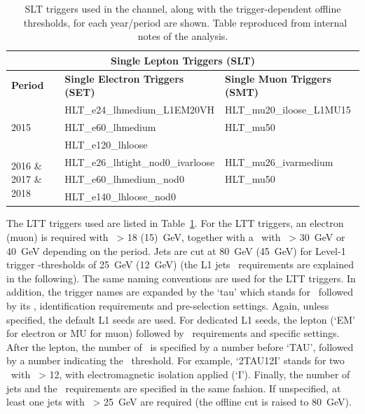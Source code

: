 \begin{table}
  \scriptsize
  \begin{tabular}{lll}
    \midrule
    \multicolumn{3}{c}{\textbf{Single Lepton Triggers (SLT)}} \\
    \midrule
    \textbf{Period} & \textbf{Single Electron Triggers (SET)} 
    & \textbf{Single Muon Triggers (SMT)}   \\
    \midrule 
    \multirow{3}{*}{2015} & HLT\_e24\_lhmedium\_L1EM20VH &HLT\_mu20\_iloose\_L1MU15\\
    & HLT\_e60\_lhmedium  & HLT\_mu50  \\
    & HLT\_e120\_lhloose & \\
    \midrule
    \multirow{3}{*}{2016 \& 2017 \& 2018} & HLT\_e26\_lhtight\_nod0\_ivarloose  & HLT\_mu26\_ivarmedium \\
    & HLT\_e60\_lhmedium\_nod0  & HLT\_mu50\\
    & HLT\_e140\_lhloose\_nod0 \\
 \bottomrule
  \end{tabular}
 \caption{SLT triggers used in the \lephad channel, along with the trigger-dependent offline \pT\ thresholds, for each year/period are shown.
 Table reproduced from internal notes of the analysis.}
  \label{tab:SLTtriggers_lephad}
\end{table}


The LTT triggers used are listed in Table~\ref{tab:SLTtriggers_lephad}. 
For the LTT triggers, an electron (muon) is required with
\pt\ > 18 (15)~GeV, together with 
a \tauhad\ with \pt\ > 30~GeV or 40~GeV depending on the period.
Jets are cut at 80~GeV (45~GeV) for Level-1 trigger \pt-thresholds of 25~GeV (12~GeV)
(the L1 jets \pt\ requirements are explained in the following). 
The same naming conventions are used for the LTT triggers. 
In addition, the trigger names are expanded by the `tau' which 
stands for \tauhad\ followed by its \pt, identification requirements
and pre-selection settings. Again, unless specified, the default
L1 seeds are used. For dedicated L1 seeds, the lepton (`EM' for electron
or MU for muon) followed by \pt\ requirements and specific settings. 
After the lepton, the number of \tauhad\ is specified by a number before 
`TAU', followed by a number indicating the \pt\ threshold. For example, 
`2TAU12I' stands for two \tauhad\ with \pt\ > 12, with electromagnetic
isolation applied (`I'). Finally, the number of jets and the \pt\ requirements
are specified in the same fashion. If unspecified, at least one jets with \pt\ > 25~GeV
are required (the offline cut is raised to 80~GeV).

